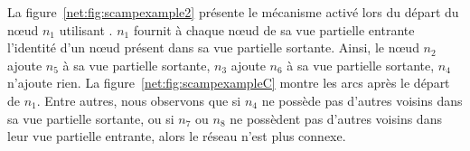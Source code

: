 \noindent La figure~\ref{net:fig:scampexample2} présente le mécanisme activé
lors du départ du nœud $n_1$ utilisant \SCAMP. $n_1$ fournit à chaque nœud de sa
vue partielle entrante l'identité d'un nœud présent dans sa vue partielle
sortante. Ainsi, le nœud $n_2$ ajoute $n_5$ à sa vue partielle sortante, $n_3$
ajoute $n_6$ à sa vue partielle sortante, $n_4$ n'ajoute rien. La
figure~\ref{net:fig:scampexampleC} montre les arcs après le départ de
$n_1$. Entre autres, nous observons que si $n_4$ ne possède pas d'autres voisins
dans sa vue partielle sortante, ou si $n_7$ ou $n_8$ ne possèdent pas d'autres
voisins dans leur vue partielle entrante, alors le réseau n'est plus connexe.


